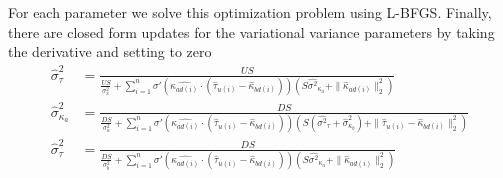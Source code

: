 \documentclass{article}
\begin{document}
For each parameter we solve this optimization problem using L-BFGS. Finally, there are closed form updates for the variational variance parameters by taking the derivative and setting to zero
\begin{align*}
\hat{\sigma}^2_\tau & = \frac{US}{\frac{US}{\sigma^2_x} + \sum_{i=1}^n \sigma'(\hat{\kappa_{ad(i)}} \cdot (\hat{\tau}_{u(i)} - \hat{\kappa}_{bd(i)}))(S\hat{\sigma^2}_{\kappa_a} + \|\hat{\kappa}_{ad(i)}\|_2^2)}\\
\hat{\sigma}^2_{\kappa_a} & = \frac{DS}{\frac{DS}{\sigma^2_a} + \sum_{i=1}^n \sigma'(\hat{\kappa_{ad(i)}} \cdot (\hat{\tau}_{u(i)} - \hat{\kappa}_{bd(i)}))(S(\hat{\sigma^2}_{\tau} + \hat{\sigma}^2_{\kappa_b}) + \|\hat{\tau}_{u(i)} - \hat{\kappa}_{bd(i)}\|_2^2)}\\
\hat{\sigma}^2_\tau & = \frac{DS}{\frac{DS}{\sigma^2_b} + \sum_{i=1}^n \sigma'(\hat{\kappa_{ad(i)}} \cdot (\hat{\tau}_{u(i)} - \hat{\kappa}_{bd(i)}))(S\hat{\sigma^2}_{\kappa_a} + \|\hat{\kappa}_{ad(i)}\|_2^2)}
\end{align*}
\end{document}
